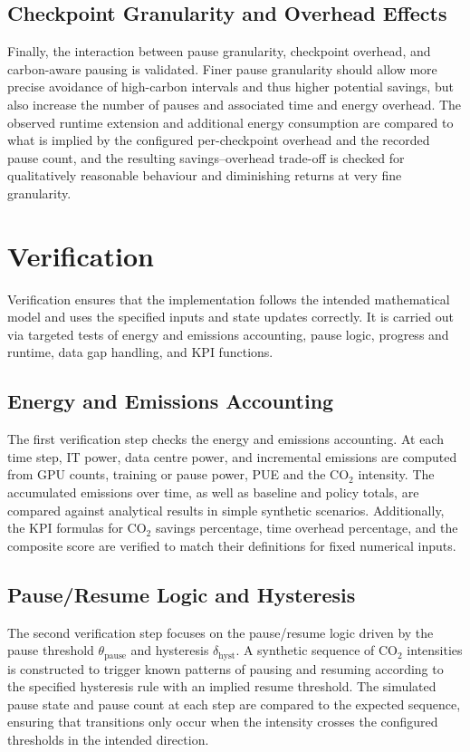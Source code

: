 \subsection{Checkpoint Granularity and Overhead Effects}

Finally, the interaction between pause granularity, checkpoint overhead, and
carbon-aware pausing is validated. Finer pause granularity should allow more
precise avoidance of high-carbon intervals and thus higher potential savings,
but also increase the number of pauses and associated time and energy
overhead. The observed runtime extension and additional energy consumption are
compared to what is implied by the configured per-checkpoint overhead and the
recorded pause count, and the resulting savings–overhead trade-off is checked
for qualitatively reasonable behaviour and diminishing returns at very fine
granularity.

\section{Verification}

Verification ensures that the implementation follows the intended
mathematical model and uses the specified inputs and state updates correctly.
It is carried out via targeted tests of energy and emissions accounting,
pause logic, progress and runtime, data gap handling, and KPI functions.

\subsection{Energy and Emissions Accounting}

The first verification step checks the energy and emissions accounting. At
each time step, IT power, data centre power, and incremental emissions are
computed from GPU counts, training or pause power, PUE and the CO$_2$
intensity. The accumulated emissions over time, as well as baseline and policy
totals, are compared against analytical results in simple synthetic scenarios.
Additionally, the KPI formulas for CO$_2$ savings percentage, time overhead
percentage, and the composite score are verified to match their definitions
for fixed numerical inputs.

\subsection{Pause/Resume Logic and Hysteresis}

The second verification step focuses on the pause/resume logic driven by the
pause threshold $\theta_{\text{pause}}$ and hysteresis
$\delta_{\text{hyst}}$. A synthetic sequence of CO$_2$ intensities is
constructed to trigger known patterns of pausing and resuming according to
the specified hysteresis rule with an implied resume threshold. The simulated
pause state and pause count at each step are compared to the expected
sequence, ensuring that transitions only occur when the intensity crosses the
configured thresholds in the intended direction.

